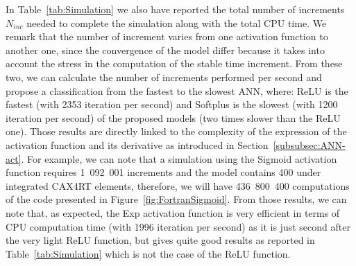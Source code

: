 \documentclass[algorithms,article,submit,pdftex,oneauthors]{Definitions/mdpi}
\begin{document}
In Table~\ref{tab:Simulation} we also have reported the total number of increments $N_{inc}$ needed to complete the simulation along with the total CPU time.
We remark that the number of increment varies from one activation function to another one, since the convergence of the model differ because it takes into account the stress in the computation of the stable time increment.
From these two, we can calculate the number of increments performed per second and propose a classification from the fastest to the slowest ANN, where: ReLU is the fastest (with 2353 iteration per second) and Softplus is the slowest (with 1200 iteration per second) of the proposed models (two times slower than the ReLU one).
Those results are directly linked to the complexity of the expression of the activation function and its derivative as introduced in Section~\ref{subsubsec:ANN-act}.
For example, we can note that a simulation using the Sigmoid activation function requires 1~092~001 increments and the model contains 400 under integrated CAX4RT elements, therefore, we will have 436~800~400 computations of the code presented in Figure~\ref{fig:FortranSigmoid}.
From those results, we can note that, as expected, the Exp activation function is very efficient in terms of CPU computation time (with 1996 iteration per second) as it is just second after the very light ReLU function, but gives quite good results as reported in Table~\ref{tab:Simulation} which is not the case of the ReLU function.
\end{document}
